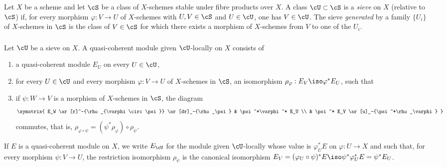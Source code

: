 \documentclass[oneside]{book}
\begin{document}
\subsubsection{}\label{I:1-4-3}

Let $X$ be a scheme and let $\cS$ be a class of $X$-schemes stable under
fibre products over $X$. A class $\cU\subset\cS$ is a \emph{sieve} on
$X$ (relative to $\cS$) if, for every morphism $\varphi:V\to U$ of
$X$-schemes with $U,V\in\cS$ and $U\in\cU$, one has $V\in\cU$.
The sieve \emph{generated} by a family $\{U_i\}$ of $X$-schemes in
$\cS$ is the class of $V\in\cS$ for which there exists a morphism of
$X$-schemes from $V$ to one of the $U_i$.

\subsubsection{}\label{I:1-4-4}

Let $\cU$ be a sieve on $X$. A quasi-coherent module given
$\cU$-locally on $X$ consists of
\begin{enumerate}[\indent a)]
  \item a quasi-coherent module $E_U$ on every $U\in\cU$,
  \item for every $U\in\cU$ and every morphism $\varphi:V\to U$ of
    $X$-schemes in $\cS$, an isomorphism
    $\rho_\varphi:E_V\iso\varphi^*E_U$, such that
  \item if $\psi:W\to V$ is a morphism of $X$-schemes in $\cS$, the
    diagram
    \[\xymatrix{
      E_W \ar[r]^-{\rho_{\varphi\circ\psi}} \ar[dr]_-{\rho_\psi}
        & \psi^*\varphi^* E_U \\
      & \psi^* E_V \ar[u]_-{\psi^*\rho_\varphi}
    }\]
    commutes, that is,
    $\rho_{\varphi\circ\psi}=(\psi^*\rho_\varphi)\circ\rho_\psi$.
\end{enumerate}

If $E$ is a quasi-coherent module on $X$, we write $E_\cU$ for the
module given $\cU$-locally whose value is $\varphi_U^*E$ on
$\varphi:U\to X$ and such that, for every morphism $\psi:V\to U$, the
restriction isomorphism $\rho_\psi$ is the canonical isomorphism
$E_V=(\varphi_U\circ\psi)^*E\iso\psi^*\varphi_U^*E=\psi^*E_U$.
\end{document}
